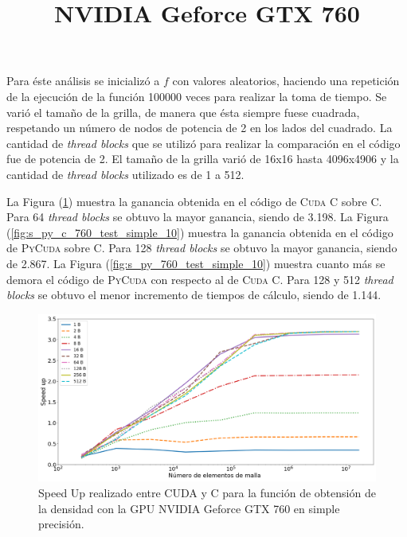 Para éste análisis se inicializó a $f$ con valores aleatorios, haciendo una repetición de la ejecución de la función 100000 veces para realizar la toma de tiempo. Se varió el tamaño de la grilla, de manera que ésta siempre fuese cuadrada, respetando un número de nodos de potencia de 2 en los lados del cuadrado. La cantidad de \textit{thread blocks} que se utilizó para realizar la comparación en el código fue de potencia de 2. El tamaño de la grilla varió de 16x16 hasta 4096x4906 y la cantidad de \textit{thread blocks} utilizado es de 1 a 512.


\title{\textbf{NVIDIA Geforce GTX 760}}

La Figura (\ref{fig:s_cuda_760_test_simple_10}) muestra la ganancia obtenida en el código de \textsc{Cuda C} sobre \textsc{C}. Para 64 \textit{thread blocks} se obtuvo la mayor ganancia, siendo de 3.198. La Figura (\ref{fig:s_py_c_760_test_simple_10}) muestra la ganancia obtenida en el código de \textsc{PyCuda} sobre \textsc{C}. Para 128 \textit{thread blocks} se obtuvo la mayor ganancia, siendo de 2.867. La Figura (\ref{fig:s_py_760_test_simple_10}) muestra cuanto más se demora el código de \textsc{PyCuda} con respecto al de \textsc{Cuda C}. Para 128 y 512  \textit{thread blocks} se obtuvo el menor incremento de tiempos de cálculo, siendo de 1.144. 

\begin{figure}[h!]
	\centering
	\includegraphics[width=\textwidth]{figs/cap4/s_cuda_760_test_simple_10}
	\caption{Speed Up realizado entre CUDA y C para la función de obtensión de la densidad con la GPU NVIDIA Geforce GTX 760 en simple precisión.} 
	\label{fig:s_cuda_760_test_simple_10}	
\end{figure}

